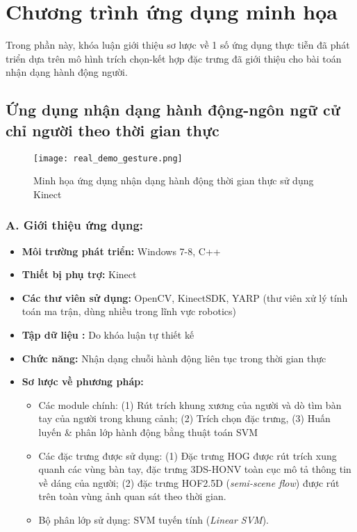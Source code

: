 \section{Chương trình ứng dụng minh họa}
Trong phần này, khóa luận giới thiệu sơ lược về 1 số ứng dụng thực tiễn đã phát triển dựa trên mô hình trích chọn-kết hợp đặc trưng đã giới thiệu cho bài toán nhận dạng hành động người. 

\subsection{Ứng dụng nhận dạng hành động-ngôn ngữ cử chỉ người theo thời gian thực}
\begin{figure}
\centering
\texttt{[image: real\_demo\_gesture.png]}
\caption{Minh họa ứng dụng nhận dạng hành động thời gian thực sử dụng Kinect}
\label{fig_real_gest_demo}
\end{figure}
\subsubsection{A. Giới thiệu ứng dụng:}
\begin{itemize}
	\item \textbf{Môi trường phát triển:} Windows 7-8, C++
	\item \textbf{Thiết bị phụ trợ:} Kinect
	\item \textbf{Các thư viên sử dụng:} OpenCV, KinectSDK, YARP (thư viên xử lý tính toán ma trận, dùng nhiều trong lĩnh vực robotics)
	\item \textbf{Tập dữ liệu :} Do khóa luận tự thiết kế
	\item \textbf{Chức năng:} Nhận dạng chuỗi hành động liên tục trong thời gian thực
	\item \textbf{Sơ lược về phương pháp: } 
		\begin{itemize}
			\item Các module chính: (1) Rút trích khung xương của người và dò tìm bàn tay của người trong khung cảnh; (2) Trích chọn đặc trưng, (3) Huấn luyến \& phân lớp hành động bằng thuật toán SVM
			\item Các đặc trưng được sử dụng: (1) Đặc trưng HOG được rút trích xung quanh các vùng bàn tay, đặc trưng 3DS-HONV toàn cục mô tả thông tin về dáng của người; (2) đặc trưng HOF2.5D (\textit{semi-scene flow}) được rút trên toàn vùng ảnh quan sát theo thời gian.
			\item Bộ phân lớp sử dụng: SVM tuyến tính (\textit{Linear SVM}).
		\end{itemize}		
\end{itemize}

